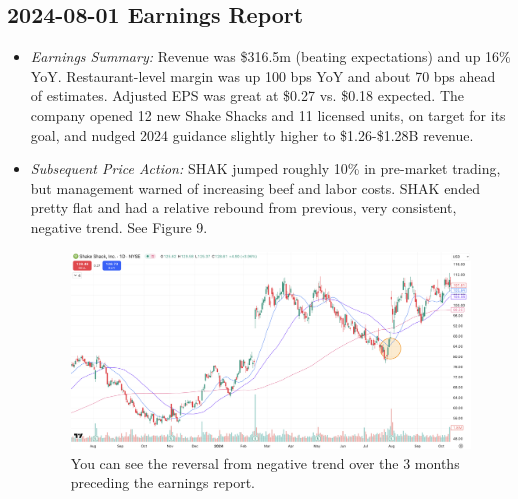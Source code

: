 \documentclass[11pt]{article}
\begin{document}
    \subsection{2024-08-01 Earnings Report}
        \begin{itemize}
            \item \textit{Earnings Summary:} Revenue was \$316.5m (beating expectations) and up 16\% YoY. Restaurant-level margin was up 100 bps YoY and about 70 bps ahead of estimates. Adjusted EPS was great at \$0.27 vs. \$0.18 expected. The company opened 12 new Shake Shacks and 11 licensed units, on target for its goal, and nudged 2024 guidance slightly higher to \$1.26-\$1.28B revenue.
            \item \textit{Subsequent Price Action:} SHAK jumped roughly 10\% in pre-market trading, but management warned of increasing beef and labor costs. SHAK ended pretty flat and had a relative rebound from previous, very consistent, negative trend. See Figure 9.
            \begin{figure}[h]
                \centering \includegraphics[width=0.8\linewidth]{images/SHAK1.png}
                \caption{You can see the reversal from negative trend over the 3 months preceding the earnings report.}
            \end{figure}
        \end{itemize}
\end{document}
